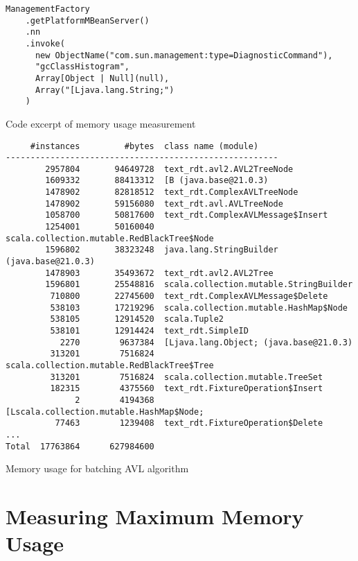 \begin{listing}
  \begin{verbatim}
ManagementFactory
    .getPlatformMBeanServer()
    .nn
    .invoke(
      new ObjectName("com.sun.management:type=DiagnosticCommand"),
      "gcClassHistogram",
      Array[Object | Null](null),
      Array("[Ljava.lang.String;")
    )
\end{verbatim}
  \caption{Code excerpt of memory usage measurement}
  \label{lst:memory-usage}
\end{listing}

\begin{listing}
  \begin{verbatim}
     #instances         #bytes  class name (module)
-------------------------------------------------------
        2957804       94649728  text_rdt.avl2.AVL2TreeNode
        1609332       88413312  [B (java.base@21.0.3)
        1478902       82818512  text_rdt.ComplexAVLTreeNode
        1478902       59156080  text_rdt.avl.AVLTreeNode
        1058700       50817600  text_rdt.ComplexAVLMessage$Insert
        1254001       50160040  scala.collection.mutable.RedBlackTree$Node
        1596802       38323248  java.lang.StringBuilder (java.base@21.0.3)
        1478903       35493672  text_rdt.avl2.AVL2Tree
        1596801       25548816  scala.collection.mutable.StringBuilder
         710800       22745600  text_rdt.ComplexAVLMessage$Delete
         538103       17219296  scala.collection.mutable.HashMap$Node
         538105       12914520  scala.Tuple2
         538101       12914424  text_rdt.SimpleID
           2270        9637384  [Ljava.lang.Object; (java.base@21.0.3)
         313201        7516824  scala.collection.mutable.RedBlackTree$Tree
         313201        7516824  scala.collection.mutable.TreeSet
         182315        4375560  text_rdt.FixtureOperation$Insert
              2        4194368  [Lscala.collection.mutable.HashMap$Node;
          77463        1239408  text_rdt.FixtureOperation$Delete
...
Total  17763864      627984600
\end{verbatim}
  \caption{Memory usage for \protect\gls{batching AVL algorithm}}
  \label{lst:memory-usage-results}
\end{listing}



\section{Measuring Maximum Memory Usage} \label{sec:memory-results}

